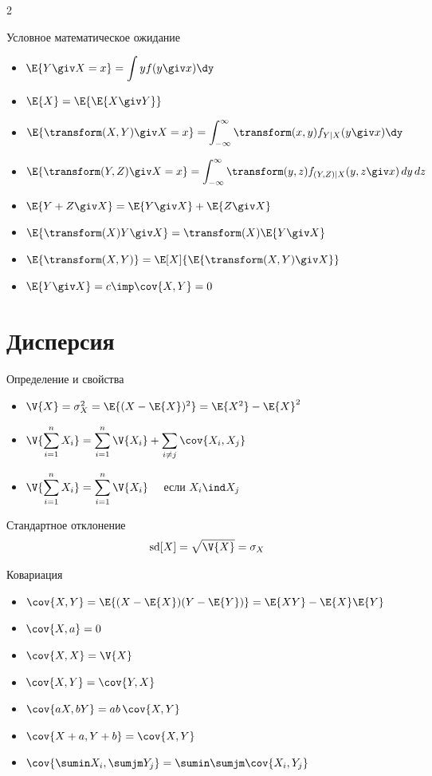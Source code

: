 \documentclass[landscape]{article}
\def\sd{\ensuremath{\operatorname{sd}}\xspace}
\newenvironment{titemize}[1]{
  \begin{minipage}[h]{\columnwidth}
    #1
    \begin{itemize}
}{
    \end{itemize}
  \end{minipage}
}
\begin{document}
\begin{multicols*}{2}
\begin{titemize}{Условное математическое ожидание}
  \item $\E{Y\giv X=x} = \displaystyle\int y f(y\giv x)\dy$
  \item $\E{X} = \E{\E{X\giv Y}}$
  \item $\E{\transform(X,Y)\giv X=x}
    = \displaystyle\int_{-\infty}^\infty \transform(x,y)f_{Y|X}(y\giv x)\dy$
  \item $\E{\transform(Y,Z)\giv X=x} =
    \displaystyle\int_{-\infty}^\infty\transform(y,z)
    f_{(Y,Z)|X}(y,z\giv x)\,dy\,dz$
  \item $\E{Y+Z\giv X} = \E{Y\giv X} + \E{Z\giv X}$
  \item $\E{\transform(X)Y\giv X} = \transform(X)\E{Y\giv X}$
  \item $\E{\transform(X,Y)} = \E[X]{\E{\transform(X,Y)\giv X}}$
  \item $\E{Y\giv X} = c \imp \cov{X,Y}=0$
\end{titemize}

\section{Дисперсия}

\begin{titemize}{Определение и свойства}
  \item $\V{X} = \sigma_X^2 = \E{(X-\E{X})^2} = \E{X^2} - \E{X}^2$
  \item $\V{\displaystyle\sum_{i=1}^n X_i} =
    \displaystyle\sum_{i=1}^n \V{X_i} + \sum_{i\ne j}\cov{X_i,X_j}$
  \item $\V{\displaystyle\sum_{i=1}^n X_i} =
    \displaystyle\sum_{i=1}^n\V{X_i} \quad$ если $X_i \ind X_j$
\end{titemize}

Стандартное отклонение
\[\sd[X] = \sqrt{\V{X}} = \sigma_X\]

Ковариация
\begin{itemize}
  \item $\cov{X,Y} = \E{(X-\E{X})(Y-\E{Y})} = \E{XY}-\E{X}\E{Y}$
  \item $\cov{X,a} = 0$
  \item $\cov{X,X} = \V{X}$
  \item $\cov{X,Y} = \cov{Y,X}$
  \item $\cov{aX,bY} = ab\,\cov{X,Y}$
  \item $\cov{X+a,Y+b} = \cov{X,Y}$
  \item $\cov{\displaystyle\sumin X_i, \sumjm Y_j}
    = \displaystyle\sumin\sumjm\cov{X_i, Y_j}$
\end{itemize}


\end{multicols*}
\end{document}
